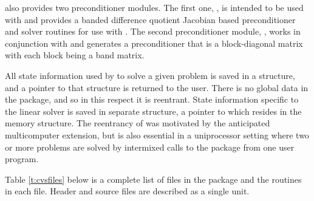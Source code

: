 {\cvodes} also provides two preconditioner modules. The first one, 
{\cvbandpre}, is intended to be used with {\nvecs} and provides
a banded difference quotient Jacobian based preconditioner and solver
routines for use with {\cvspgmr}. The second preconditioner module, 
{\cvbbdpre}, works in conjunction with {\nvecp} and generates a 
preconditioner that is a block-diagonal matrix with each block being 
a band matrix.

All state information used by {\cvodes} to solve a given problem is saved
in a structure, and a pointer to that structure is returned to the
user.  There is no global data in the {\cvodes} package, and so in this
respect it is reentrant. State information specific to the linear
solver is saved in separate structure, a pointer to which resides in
the {\cvodes} memory structure. The reentrancy of {\cvodes} was motivated
by the anticipated multicomputer extension, but is also essential
in a uniprocessor setting where two or more problems are solved by
intermixed calls to the package from one user program.

Table \ref{t:cvsfiles} below is a complete list of files in the {\cvodes}
package and the routines in each file. 
Header and source files are described as a single unit.

